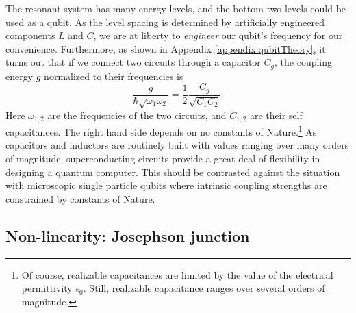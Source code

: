 The resonant system has many energy levels, and the bottom two levels could be used as a qubit.
As the level spacing is determined by artificially engineered components $L$ and $C$, we are at liberty to \emph{engineer} our qubit's frequency for our convenience.
Furthermore, as shown in Appendix \ref{appendix:qubitTheory}, it turns out that if we connect two circuits through a capacitor $C_g$, the coupling energy $g$ normalized to their frequencies is \begin{equation}
\frac{g}{\hbar \sqrt{\omega_1 \omega_2}} = \frac{1}{2} \frac{C_g}{\sqrt{C_1 C_2}}. \end{equation}
Here $\omega_{1,2}$ are the frequencies of the two circuits, and $C_{1,2}$ are their self capacitances.
The right hand side depends on no constants of Nature.\footnote{Of course, realizable capacitances are limited by the value of the electrical permittivity $\epsilon_0$. Still, realizable capacitance ranges over several orders of magnitude.}
As capacitors and inductors are routinely built with values ranging over many orders of magnitude, superconducting circuits provide a great deal of flexibility in designing a quantum computer.
This should be contrasted against the situation with microscopic single particle qubits where intrinsic coupling strengths are constrained by constants of Nature.

\subsection{Non-linearity: Josephson junction}

